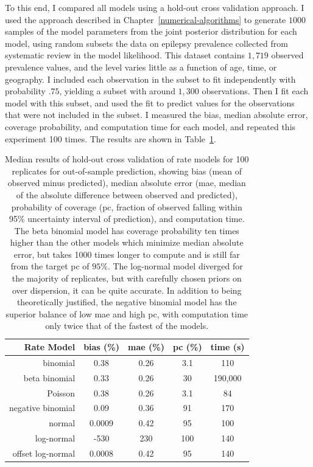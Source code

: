 To this end, I compared all models using a hold-out cross validation
approach.  I used the approach described in
Chapter~\ref{numerical-algorithms} to generate $1000$ samples of the
model parameters from the joint posterior distribution for each model,
using random subsets the data on epilepsy prevalence collected from
systematic review\cite{TK} in the model likelihood.  This dataset
contains $1,719$ observed prevalence values, and the level varies
little as a function of age, time, or geography.  I included each
observation in the subset to fit independently with probability $.75$,
yielding a subset with around $1,300$ observations. Then I fit each
model with this subset, and used the fit to predict values for the
observations that were not included in the subset.  I measured the
bias, median absolute error, coverage probability, and computation
time for each model, and repeated this experiment 100 times.  The
results are shown in Table~\ref{rate-comparison}.

\begin{table}
\begin{center}
\begin{tabular}{|r|c|c|c|c|}
\hline
Rate Model       &bias (\%)&mae (\%)&pc (\%)&time (s)\\
\hline
binomial         &0.38     &0.26    &3.1    &110\\
beta binomial    &0.33     &0.26    &30     &190,000\\
Poisson          &0.38     &0.26    &3.1    &84\\
negative binomial&0.09     &0.36    &91     &170\\
normal           &0.0009   &0.42    &95     &100\\
log-normal       &-530     &230     &100    &140\\
offset log-normal&0.0008   &0.42    &95     &140\\
\hline
\end{tabular}
\end{center}
\caption{Median results of hold-out cross validation of rate models
  for 100 replicates for out-of-sample prediction, showing bias (mean
  of observed minus predicted), median absolute error (mae, median of
  the absolute difference between observed and predicted), probability
  of coverage (pc, fraction of observed falling within 95\% uncertainty
  interval of prediction), and computation time.  The beta binomial
  model has coverage probability ten times higher than the other
  models which minimize median absolute error, but takes 1000 times
  longer to compute and is still far from the target pc of $95\%$.
  The log-normal model diverged for the majority of replicates, but
  with carefully chosen priors on over dispersion, it can be quite
  accurate.  In addition to being theoretically justified, the
  negative binomial model has the superior balance of low mae and high
  pc, with computation time only twice that of the fastest of the
  models.}
\label{rate-comparison}
\end{table}

